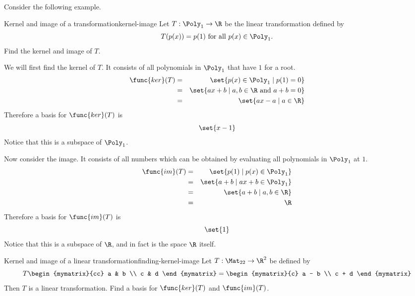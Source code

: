 Consider the following example.

\begin{example}{Kernel and image of a transformation}{kernel-image}
Let $T:\Poly_1\to\R$ be the linear transformation defined by
\[ T(p(x))=p(1)\mbox{ for all } p(x)\in \Poly_1.\]
Find the kernel and image of $T$.
\end{example}

\begin{solution}
We will first find the kernel of $T$. It consists of all polynomials in $\Poly_1$ that have $1$ for a root. 
\begin{eqnarray*}
\func{ker}(T) & = & \set{p(x)\in \Poly_1 \mid p(1)=0} \\
& = & \set{ax+b \mid a,b\in\R \mbox{ and }a+b=0} \\
& = & \set{ax-a \mid a\in\R}
\end{eqnarray*}
Therefore a basis for $\func{ker}(T)$ is 
\[
\set{x-1 }
\]
Notice that this is a subspace of $\Poly_1$. 

Now consider the image. It consists of all numbers which can be obtained by evaluating all polynomials in $\Poly_1$ at $1$. 
\begin{eqnarray*}
\func{im}(T) & = & \set{p(1) \mid p(x)\in \Poly_1} \\
 & = & \set{a+b \mid ax+b\in \Poly_1} \\
 & = & \set{a+b \mid a,b\in\R}\\
 & = & \R
\end{eqnarray*}
Therefore a basis for $\func{im}(T)$ is 
\[
\set{1 }
\]
Notice that this is a subspace of $\R$, and in fact is the space $\R$ itself. 
\end{solution}

\begin{example}{Kernel and image of a linear transformation}{finding-kernel-image}
Let $T: \Mat_{22} \to \R^2$ be defined by
\[
T \begin{mymatrix}{cc}
a & b \\
c & d 
\end{mymatrix}
 = 
\begin{mymatrix}{c}
a - b \\
c + d
\end{mymatrix}
\]
Then $T$ is a linear transformation. Find a basis for $\func{ker} (T)$ and $\func{im}(T)$.
\end{example}

